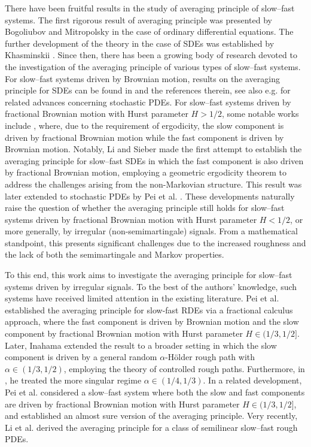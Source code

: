 \documentclass[10pt,a4paper]{article}
\numberwithin{equation}{section}
\begin{document}
There have been fruitful results in the study of averaging principle of slow--fast systems.
The first rigorous result of averaging principle was presented by Bogoliubov and Mitropolsky \cite{BM61} in the case of ordinary differential equations.
The further development of the theory in the case of SDEs was established by Khasminskii \cite{K68}.
Since then, there has been a growing body of research devoted to the investigation of the averaging principle of various types of slow--fast systems.
For slow--fast systems driven by Brownian motion, results on the averaging principle for SDEs can be found in \cite{GKK06,GL90,GR16,LD10,LRSX20} and the references therein, see also e.g. \cite{C09,CF09,CL17,CZ25,HLL22,LRSX23,SXX21} for related advances concerning stochastic PDEs.
For slow--fast systems driven by fractional Brownian motion with Hurst parameter $H > 1/2$,
some notable works include \cite{HL20,HXPW22,LGQ25,PIX23,PIX20,SXW22}, where, due to the requirement of ergodicity, the slow component is driven by fractional Brownian motion while the fast component is driven by Brownian motion.
Notably, Li and Sieber \cite{LS22} made the first attempt to establish the averaging principle for slow--fast SDEs in which the fast component is also driven by fractional Brownian motion, employing a geometric ergodicity theorem to address the challenges arising from the non-Markovian structure.
This result was later extended to stochastic PDEs by Pei et al. \cite{PSX24}.
These developments naturally raise the question of whether the averaging principle still holds for slow--fast systems driven by fractional Brownian motion with Hurst parameter $H<1/2$, or more generally, by irregular (non-semimartingale) signals.
From a mathematical standpoint, this presents significant challenges due to the increased roughness and the lack of both the semimartingale and Markov properties.





To this end, this work aims to investigate the averaging principle for slow--fast systems driven by irregular signals.
To the best of the authors' knowledge, such systems have received limited attention in the existing literature.
Pei et al. \cite{PIX21} established the averaging principle for slow-fast RDEs via a fractional calculus approach, where the fast component is driven by Brownian motion and the slow component by fractional Brownian motion with Hurst parameter $H \in (1/3, 1/2]$.
Later, Inahama \cite{In22} extended the result to a broader setting in which the slow component is driven by a general random $\alpha$-H\"{o}lder rough path with $\alpha \in (1/3, 1/2)$, employing the theory of controlled rough paths.
Furthermore, in \cite{In25}, he treated the more singular regime $\alpha \in (1/4, 1/3)$.
In a related development, Pei et al. \cite{PHSX23} considered a slow--fast system where both the slow and fast components are driven by fractional Brownian motion with Hurst parameter $H \in (1/3, 1/2]$, and established an almost sure version of the averaging principle.
Very recently, Li et al. \cite{LLPX25} derived the averaging principle for a class of semilinear slow--fast rough PDEs.
\end{document}
